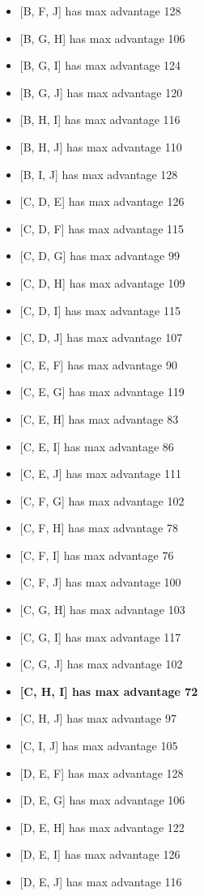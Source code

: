 \begin{puzzleSolutions}
\begin{multicols}{2}
\begin{itemize}
\item{} [B, F, J] has max advantage 128
\item{} [B, G, H] has max advantage 106
\item{} [B, G, I] has max advantage 124
\item{} [B, G, J] has max advantage 120
\item{} [B, H, I] has max advantage 116
\item{} [B, H, J] has max advantage 110
\item{} [B, I, J] has max advantage 128
\item{} [C, D, E] has max advantage 126
\item{} [C, D, F] has max advantage 115
\item{} [C, D, G] has max advantage 99
\item{} [C, D, H] has max advantage 109
\item{} [C, D, I] has max advantage 115
\item{} [C, D, J] has max advantage 107
\item{} [C, E, F] has max advantage 90
\item{} [C, E, G] has max advantage 119
\item{} [C, E, H] has max advantage 83
\item{} [C, E, I] has max advantage 86
\item{} [C, E, J] has max advantage 111
\item{} [C, F, G] has max advantage 102
\item{} [C, F, H] has max advantage 78
\item{} [C, F, I] has max advantage 76
\item{} [C, F, J] has max advantage 100
\item{} [C, G, H] has max advantage 103
\item{} [C, G, I] has max advantage 117
\item{} [C, G, J] has max advantage 102
\item{} \textbf{[C, H, I] has max advantage 72}
\item{} [C, H, J] has max advantage 97
\item{} [C, I, J] has max advantage 105
\item{} [D, E, F] has max advantage 128
\item{} [D, E, G] has max advantage 106
\item{} [D, E, H] has max advantage 122
\item{} [D, E, I] has max advantage 126
\item{} [D, E, J] has max advantage 116

\end{itemize}
\end{multicols}
\end{puzzleSolutions}
